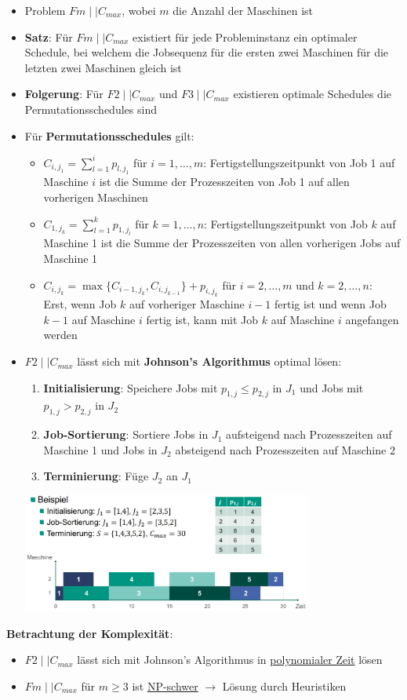 \begin{itemize}
	\item Problem $Fm\mid\mid C_{max}$, wobei $m$ die Anzahl der Maschinen ist
	\item \textbf{Satz}: Für $Fm\mid\mid C_{max}$ existiert für jede Probleminstanz ein optimaler Schedule, bei welchem die Jobsequenz für die ersten zwei Maschinen für die letzten zwei Maschinen gleich ist
	\item \textbf{Folgerung}: Für $F2\mid\mid C_{max}$ und $F3\mid\mid C_{max}$ existieren optimale Schedules die Permutationsschedules sind
	\item Für \textbf{Permutationsschedules} gilt:
	\begin{itemize}
		\item $C_{i,j_1}=\sum\limits_{l=1}^{i}p_{l,j_1}$ für $i=1,\ldots,m$: Fertigstellungszeitpunkt von Job 1 auf Maschine $i$ ist die Summe der Prozesszeiten von Job 1 auf allen vorherigen Maschinen
		\item $C_{1,j_k}=\sum\limits_{l=1}^{k}p_{1,j_l}$ für $k=1,\ldots,n$:
		Fertigstellungszeitpunkt von Job $k$ auf Maschine 1 ist die Summe der Prozesszeiten von allen vorherigen Jobs auf Maschine 1
		\item $C_{i,j_k}=\max\{C_{i-1,j_k},C_{i,j_{k-1}}\}+p_{i,j_k}$ für $i=2,\ldots,m$ und $k=2,\ldots,n$:\\
		Erst, wenn Job $k$ auf vorheriger Maschine $i-1$ fertig ist und wenn Job $k-1$ auf Maschine $i$ fertig ist, kann mit Job $k$ auf Maschine $i$ angefangen werden
	\end{itemize}
	\item $F2\mid\mid C_{max}$ lässt sich mit \textbf{Johnson's Algorithmus} optimal lösen:
	\begin{enumerate}
		\item \textbf{Initialisierung}: Speichere Jobs mit $p_{1,j}\leq p_{2,j}$ in $J_1$ und Jobs mit $p_{1,j}>p_{2,j}$ in $J_2$
		\item \textbf{Job-Sortierung}: Sortiere Jobs in $J_1$ aufsteigend nach Prozesszeiten auf Maschine 1 und Jobs in $J_2$ absteigend nach Prozesszeiten auf Maschine 2
		\item \textbf{Terminierung}: Füge $J_2$ an $J_1$
	\end{enumerate}
	\begin{center}
		\includegraphics[width=0.75\textwidth]{images/johnson.png}
	\end{center}
\end{itemize}

\textbf{Betrachtung der Komplexität}:
\begin{itemize}
	\item $F2\mid\mid C_{max}$ lässt sich mit Johnson's Algorithmus in \underline{polynomialer Zeit} lösen
	\item $Fm\mid\mid C_{max}$ für $m\geq 3$ ist \underline{NP-schwer} $\rightarrow$ Lösung durch Heuristiken
\end{itemize}